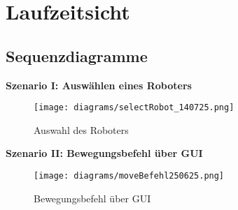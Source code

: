 
\chapter{Laufzeitsicht}

\section{Sequenzdiagramme}
\textbf{Szenario I: Auswählen eines Roboters}\\

\begin{figure}[h]
    \centering
    \texttt{[image: diagrams/selectRobot\_140725.png]}
    \caption{Auswahl des Roboters}
    \label{fig:Auswahl}
\end{figure}

\clearpage\textbf{Szenario II: Bewegungsbefehl über GUI}\\

\begin{figure}[h]  
    \centering
    \texttt{[image: diagrams/moveBefehl250625.png]}
    \caption{Bewegungsbefehl über GUI}
    \label{fig:Bewegungsbefehl}
\end{figure}




















